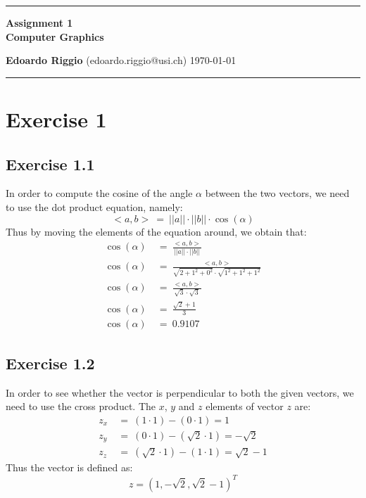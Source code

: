 \documentclass{article}
\begin{document}
\begin{center}
\hrule

\vspace{.4cm}
{\bf {\Huge Assignment 1}} \\
\vspace{.2cm}
{\bf Computer Graphics}
\vspace{.2cm}
\end{center}
{\bf Edoardo Riggio } (edoardo.riggio@usi.ch) \hspace{\fill}  \today \\
\hrule
\vspace{.2cm}

\section*{Exercise 1}
\subsection*{Exercise 1.1}
In order to compute the cosine of the angle $\alpha$ between the two vectors, we need to use the dot product equation, namely:
\begin{equation}
  <a,b>~=~||a|| \cdot ||b|| \cdot \cos(\alpha)
\end{equation}
Thus by moving the elements of the equation around, we obtain that:
\begin{align*}
  \cos(\alpha)~& =~\displaystyle\frac{<a,b>}{||a|| \cdot ||b||} \\
  \cos(\alpha)~& =~\displaystyle\frac{<a,b>}{\sqrt{2 + 1^2 + 0^2} \cdot \sqrt{1^2 + 1^2 + 1^2}} \\
  \cos(\alpha)~& = ~\displaystyle\frac{<a,b>}{\sqrt{3} \cdot \sqrt{3}} \\
  \cos(\alpha)~& = ~\displaystyle\frac{\sqrt{2}+1}{3} \\
  \cos(\alpha)~& = ~0.9107
\end{align*}

\subsection*{Exercise 1.2}
In order to see whether the vector is perpendicular to both the given vectors, we need to use the cross product. The $x$, $y$ and $z$ elements of vector $z$ are:
\begin{align*}
  z_x~& = ~(1 \cdot 1) - (0 \cdot 1) = 1 \\
  z_y~& = ~(0 \cdot 1) - (\sqrt{2} \cdot 1) = -\sqrt{2} \\
  z_z~& = ~(\sqrt{2} \cdot 1) - (1 \cdot 1) = \sqrt{2} - 1
\end{align*}
Thus the vector is defined as:
\[ z = (1, -\sqrt{2}, \sqrt{2}-1)^T \]
\end{document}
